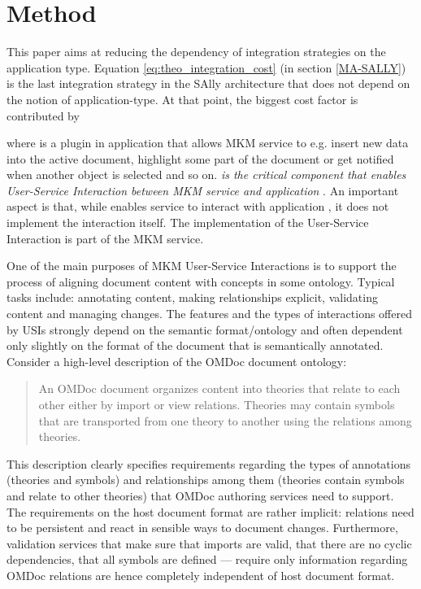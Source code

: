 \documentclass{llncs}
\begin{document}
\section{Method}
\label{method}

This paper aims at reducing the dependency of integration strategies on the application type. Equation \ref{eq:theo_integration_cost} (in section \ref{MA-SALLY}) is the last integration strategy in the SAlly architecture that does not depend on the notion of application-type. At that point, the biggest cost factor is contributed by

where  is a plugin in application  that allows MKM service  to e.g. insert new data into the active document, highlight some part of the document or get notified when another object is selected and so on. \textit{ is the critical component that enables User-Service Interaction between MKM service  and application }. An important aspect is that, while  enables service  to interact with application , it does not implement the interaction itself. The implementation of the User-Service Interaction is part of the MKM service.

One of the main purposes of MKM User-Service Interactions is to support the process of aligning document content with concepts in some ontology. Typical tasks include: annotating content, making relationships explicit, validating content and managing changes. The features and the types of interactions offered by USIs strongly depend on the semantic format/ontology and often dependent only slightly on the format of the document that is semantically annotated. Consider a high-level description of the OMDoc document ontology: 
\begin{quote}
An OMDoc document organizes content into theories that relate to each other either by import or view relations. Theories may contain symbols that are transported from one theory to another using the relations among theories. 
\end{quote}
This description clearly specifies requirements regarding the types of annotations (theories and symbols) and relationships among them (theories contain symbols and relate to other theories) that OMDoc authoring services need to support. The requirements on the host document format are rather implicit: relations need to be persistent and react in sensible ways to document changes. Furthermore, validation services that make sure that imports are valid, that there are no cyclic dependencies, that all symbols are defined --- require only information regarding OMDoc relations are hence completely independent of host document format. 
\end{document}
